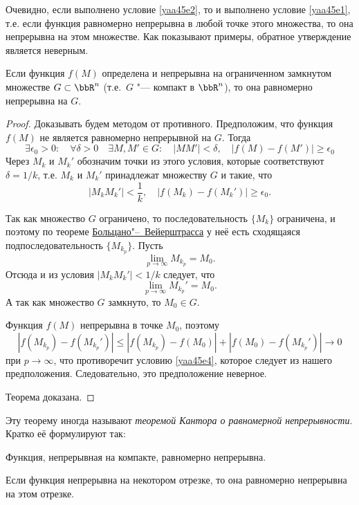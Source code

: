 Очевидно, если выполнено условие \eqref{yaa45e2}, то и выполнено условие \eqref{yaa45e1}, т.е. если функция равномерно непрерывна в любой точке этого множества, то она непрерывна на этом множестве. Как показывают примеры, обратное утверждение является неверным.

\begin{thm}
Если функция $f(M)$ определена и непрерывна на ограниченном замкнутом множестве $G\subset\bbR^n$ (т.е.~$G$ "--- компакт в $\bbR^n$), то она равномерно непрерывна на $G$.
\end{thm}

\begin{proof}
Доказывать будем методом от противного. Предположим, что функция $f(M)$ не является равномерно непрерывной на $G$. Тогда
$$
\exists\epsilon_0>0:\quad\forall\delta>0\quad\exists M,M'\in G:\quad |MM'|<\delta, \quad |f(M)-f(M')|\ge \epsilon_0
$$
Через $M_k$ и $M_k'$ обозначим точки из этого условия, которые соответствуют $\delta=1/k$, т.е. $M_k$ и $M_k'$ принадлежат множеству $G$ и такие, что 
\begin{equation}\label{yaa45e4}
|M_kM_k'|<\frac{1}{k},\quad|f(M_k)-f(M_k')|\ge \epsilon_0.
\end{equation}

Так как множество $G$ ограничено, то последовательность $\{M_k\}$ ограничена, и поэтому по теореме \hyperref[th:ch1:TBV]{Больцано"--~Вейерштрасса} у неё есть сходящаяся подпоследовательность $\{M_{k_p}\}$. Пусть
$$
\lim\limits_{p\to\infty} M_{k_p} =M_0.
$$
Отсюда и из условия $|M_kM_k'|<1/k$ следует, что 
$$
\lim\limits_{p\to\infty} M_{k_p}' =M_0.
$$
А так как множество $G$ замкнуто, то $M_0 \in G$.

Функция $f(M)$ непрерывна в точке $M_0$, поэтому
$$
|f(M_{k_p})-f(M_{k_p}')|\le |f(M_{k_p})-f(M_0)|+|f(M_0)-f(M_{k_p}')|\to 0
$$
при $p\to\infty$, что противоречит условию \eqref{yaa45e4}, которое следует из нашего предположения. Следовательно, это предположение неверное. 

Теорема доказана.
\end{proof}

Эту теорему иногда называют \textit{теоремой Кантора о равномерной непрерывности}. Кратко её формулируют так:

\begin{thmn}
Функция, непрерывная на компакте, равномерно непрерывна.
\end{thmn}

\begin{cons}
Если функция непрерывна на некотором отрезке, то она равномерно непрерывна на этом отрезке. 
\end{cons}















